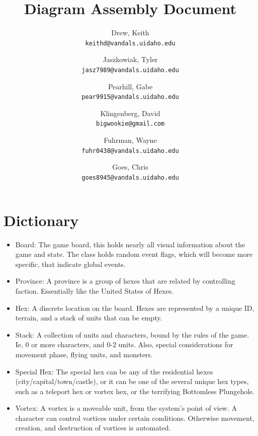 \documentclass[12pt,a4paper]{article}
\author{
  Drew, Keith\\
  \texttt{keithd@vandals.uidaho.edu}
  \and
  Jaszkowiak, Tyler\\
  \texttt{jasz7989@vandals.uidaho.edu}
  \and
  Pearhill, Gabe\\
  \texttt{pear9915@vandals.uidaho.edu}
  \and
  Klingenberg, David\\
  \texttt{bigwookie@gmail.com}
  \and 
  Fuhrman, Wayne\\
  \texttt{fuhr0438@vandals.uidaho.edu}
  \and
  Goes, Chris\\
  \texttt{goes8945@vandals.uidaho.edu}
}
\title{Diagram Assembly Document}
\begin{document}
\maketitle
\section{Dictionary}
\begin{itemize}
\item Board: The game board, this holds nearly all visual information about the game and state. The class holds random event flags, which will become more specific, that indicate global events.
\item Province: A province is a group of hexes that are related by controlling faction. Essentially like the United States of Hexes. 
\item Hex: A discrete location on the board. Hexes are represented by a unique ID, terrain, and a stack of units that can be empty.
\item Stack: A collection of units and characters, bound by the rules of the game. Ie, 0 or more characters, and 0-2 units. Also, special considerations for movement phase, flying units, and monsters.
\item Special Hex: The special hex can be any of the residential hexes (city/capital/town/castle), or it can be one of the several unique hex types, such as a teleport hex or vortex hex, or the terrifying Bottomless Plungehole.
\item Vortex: A vortex is a moveable unit, from the system's point of view. A character can control vortices under certain conditions. Otherwise movement, creation, and destruction of vortices is automated.


\end{itemize}
\end{document}
